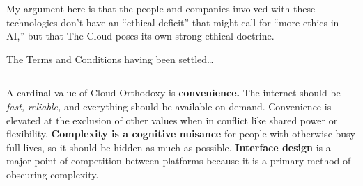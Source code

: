 \documentclass{article}
\begin{document}
My argument here is that the people and companies involved with these
technologies don't have an ``ethical deficit'' that might call for
``more ethics in AI,'' but that The Cloud poses its own strong ethical
doctrine.

The Terms and Conditions having been settled\ldots{}

\begin{center}\rule{0.5\linewidth}{0.5pt}\end{center}

A cardinal value of Cloud Orthodoxy is \textbf{convenience.} The
internet should be \emph{fast,} \emph{reliable,} and
everything
should be available on demand. Convenience is elevated at the exclusion
of other values when in conflict like shared power or flexibility.
\textbf{Complexity is a cognitive nuisance} for people with otherwise
busy full lives, so it should be hidden as much as possible.
\textbf{Interface design} is a major point of competition between
platforms because it is a primary method of obscuring complexity.
\end{document}
